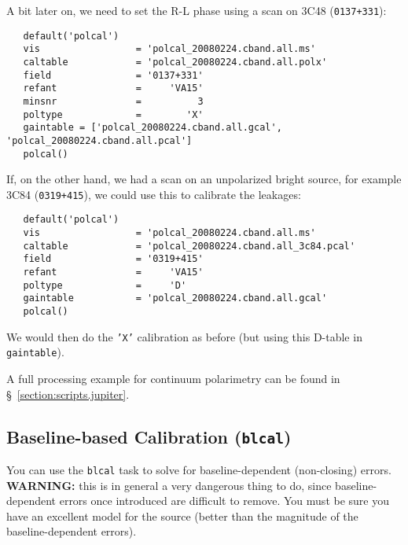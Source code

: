 A bit later on, we need to set the R-L phase using a scan on
3C48 ({\tt 0137+331}):
\small
\begin{verbatim}
   default('polcal')
   vis                 = 'polcal_20080224.cband.all.ms'
   caltable            = 'polcal_20080224.cband.all.polx'
   field               = '0137+331'
   refant              =     'VA15'        
   minsnr              =          3        
   poltype             =        'X'
   gaintable = ['polcal_20080224.cband.all.gcal', 'polcal_20080224.cband.all.pcal']
   polcal()
\end{verbatim}
\normalsize

If, on the other hand, we had a scan on an unpolarized bright source,
for example 3C84 ({\tt 0319+415}), we could use this to calibrate the
leakages:
\small
\begin{verbatim}
   default('polcal')
   vis                 = 'polcal_20080224.cband.all.ms'
   caltable            = 'polcal_20080224.cband.all_3c84.pcal'
   field               = '0319+415'
   refant              =     'VA15'        
   poltype             =     'D'        
   gaintable           = 'polcal_20080224.cband.all.gcal'
   polcal()
\end{verbatim}
\normalsize
We would then do the {\tt 'X'} calibration as before (but using this
D-table in {\tt gaintable}).

A full processing example for continuum polarimetry can be found
in \S~\ref{section:scripts.jupiter}.

\subsection{Baseline-based Calibration ({\tt blcal})}
\label{section:cal.solve.blcal}

You can use the {\tt blcal} task to solve for baseline-dependent
(non-closing) errors.  {\bf WARNING:} this is in general a very dangerous
thing to do, since baseline-dependent errors once introduced are
difficult to remove.  You must be sure you have an excellent model
for the source (better than the magnitude of the baseline-dependent
errors).

